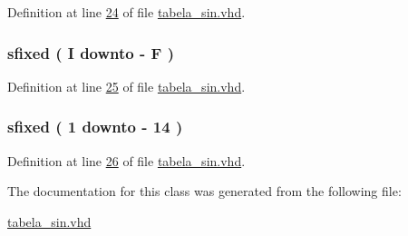 Definition at line \hyperlink{tabela__sin_8vhd_source_l00024}{24} of file \hyperlink{tabela__sin_8vhd_source}{tabela\+\_\+sin.\+vhd}.

\hypertarget{classtabela__sin_1_1tabela__sin_a1fe5e5a2ba1da85ad8c40a313351a3a5}{}
\subsubsection[{sin}]{ {\bfseries \textcolor{comment}{sfixed}\textcolor{vhdlchar}{ }\textcolor{vhdlchar}{(}\textcolor{vhdlchar}{ }\textcolor{vhdlchar}{ }\textcolor{vhdlchar}{ }\textcolor{vhdlchar}{ }{\bfseries {\bf I}} \textcolor{vhdlchar}{ }\textcolor{keywordflow}{downto}\textcolor{vhdlchar}{ }\textcolor{vhdlchar}{-\/}\textcolor{vhdlchar}{ }\textcolor{vhdlchar}{ }\textcolor{vhdlchar}{ }{\bfseries {\bf F}} \textcolor{vhdlchar}{ }\textcolor{vhdlchar}{)}\textcolor{vhdlchar}{ }} \hspace{0.3cm}{\ttfamily [Signal]}}\label{classtabela__sin_1_1tabela__sin_a1fe5e5a2ba1da85ad8c40a313351a3a5}


Definition at line \hyperlink{tabela__sin_8vhd_source_l00025}{25} of file \hyperlink{tabela__sin_8vhd_source}{tabela\+\_\+sin.\+vhd}.

\hypertarget{classtabela__sin_1_1tabela__sin_a008ca4c78c7dea76719a666c8e8ec3b8}{}
\subsubsection[{va\+\_\+\+Q14}]{ {\bfseries \textcolor{comment}{sfixed}\textcolor{vhdlchar}{ }\textcolor{vhdlchar}{(}\textcolor{vhdlchar}{ }\textcolor{vhdlchar}{ } \textcolor{vhdldigit}{1} \textcolor{vhdlchar}{ }\textcolor{keywordflow}{downto}\textcolor{vhdlchar}{ }\textcolor{vhdlchar}{-\/}\textcolor{vhdlchar}{ } \textcolor{vhdldigit}{14} \textcolor{vhdlchar}{ }\textcolor{vhdlchar}{)}\textcolor{vhdlchar}{ }} \hspace{0.3cm}{\ttfamily [Signal]}}\label{classtabela__sin_1_1tabela__sin_a008ca4c78c7dea76719a666c8e8ec3b8}


Definition at line \hyperlink{tabela__sin_8vhd_source_l00026}{26} of file \hyperlink{tabela__sin_8vhd_source}{tabela\+\_\+sin.\+vhd}.



The documentation for this class was generated from the following file\+:\begin{DoxyCompactItemize}
\item 
\hyperlink{tabela__sin_8vhd}{tabela\+\_\+sin.\+vhd}\end{DoxyCompactItemize}
